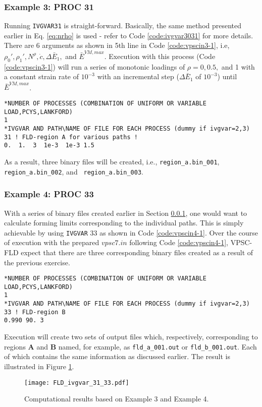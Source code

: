 \documentclass[12pt]{amsart}
\begin{document}
\subsubsection{Example 3: PROC 31}
\label{sec:ex3}
Running \verb$IVGVAR31$ is straight-forward.
Basically, the same method presented earlier in Eq. \ref{eq:nrho} is used - refer to Code \ref{code:ivgvar3031} for more details.
There are 6 arguments as shown in 5th line in Code \ref{code:vpscin3-1}, i.e, $\rho_0', \rho_1', N^{\rho}, \dot{c}, \Delta{\bar{E}_1},$ and $\bar{E}^{VM, max}$.
Execution with this process (Code \ref{code:vpscin3-1}) will run a series of monotonic loadings of $\rho=0, 0.5,$ and 1 with a constant strain rate of $10^{-3}$ with an incremental step ($\Delta{\bar{E}_1}$ of $10^{-3}$) until $\bar{E}^{VM, max}$.
\begin{lstlisting}[style=inp, caption=A portion of the input file vpsc7.in prepared for IVGVAR31, label={code:vpscin3-1}]
*NUMBER OF PROCESSES (COMBINATION OF UNIFORM OR VARIABLE LOAD,PCYS,LANKFORD)
1
*IVGVAR AND PATH\NAME OF FILE FOR EACH PROCESS (dummy if ivgvar=2,3)
31 ! FLD-region A for various paths !
0.  1.  3  1e-3  1e-3 1.5
\end{lstlisting}
As a result, three binary files will be created, i.e., \verb$region_a.bin_001$, \verb$region_a.bin_002$, and \verb$ region_a.bin_003$.

\subsubsection{Example 4: PROC 33}
\label{sec:ex4}
With a series of binary files created earlier in Section \ref{sec:ex3}, one would want to calculate forming limits corresponding to the individual paths.
This is simply achievable by using \verb$IVGVAR$ 33 as shown in Code \ref{code:vpscin4-1}.
Over the course of execution with the prepared $vpsc7.in$ following Code \ref{code:vpscin4-1}, VPSC-FLD expect that there are three corresponding binary files created as a result of the previous exercise.
\begin{lstlisting}[style=inp, caption=A portion of the input file vpsc7.in prepared for IVGVAR33, label={code:vpscin4-1}]
*NUMBER OF PROCESSES (COMBINATION OF UNIFORM OR VARIABLE LOAD,PCYS,LANKFORD)
1
*IVGVAR AND PATH\NAME OF FILE FOR EACH PROCESS (dummy if ivgvar=2,3)
33 ! FLD-region B
0.990 90. 3
\end{lstlisting}
Execution will create two sets of output files which, respectively, corresponding to regions \textbf{A} and \textbf{B} named, for example, as \verb$fld_a_001.out$ or \verb$fld_b_001.out$.
Each of which contains the same information as discussed earlier.
The result is illustrated in Figure \ref{fig:ivgvar3133}.
\begin{figure}
    \texttt{[image: FLD\_ivgvar\_31\_33.pdf]}
  \caption{Computational results based on Example 3 and Example 4.}
  \label{fig:ivgvar3133}
\end{figure}
\end{document}
